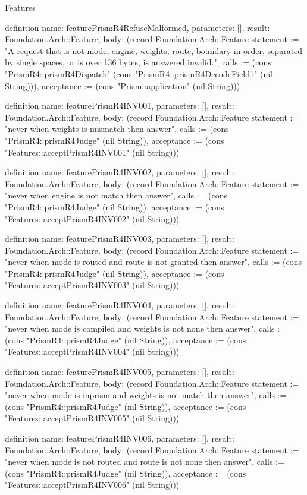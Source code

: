 \begin{lexlean}{Features}
\begin{semanticmodule}
definition{
  name: featurePrismR4RefuseMalformed,
  parameters: [],
  result: Foundation.Arch::Feature,
  body: (record Foundation.Arch::Feature {statement := "A request that is not mode, engine, weights, route, boundary in order, separated by single spaces, or is over 136 bytes, is answered invalid.", calls := (cons "PrismR4::prismR4Dispatch" (cons "PrismR4::prismR4DecodeField1" (nil String))), acceptance := (cons "Prism::application" (nil String))})
}

definition{
  name: featurePrismR4INV001,
  parameters: [],
  result: Foundation.Arch::Feature,
  body: (record Foundation.Arch::Feature {statement := "never when weights is mismatch then answer", calls := (cons "PrismR4::prismR4Judge" (nil String)), acceptance := (cons "Features::acceptPrismR4INV001" (nil String))})
}

definition{
  name: featurePrismR4INV002,
  parameters: [],
  result: Foundation.Arch::Feature,
  body: (record Foundation.Arch::Feature {statement := "never when engine is not match then answer", calls := (cons "PrismR4::prismR4Judge" (nil String)), acceptance := (cons "Features::acceptPrismR4INV002" (nil String))})
}

definition{
  name: featurePrismR4INV003,
  parameters: [],
  result: Foundation.Arch::Feature,
  body: (record Foundation.Arch::Feature {statement := "never when mode is routed and route is not granted then answer", calls := (cons "PrismR4::prismR4Judge" (nil String)), acceptance := (cons "Features::acceptPrismR4INV003" (nil String))})
}

definition{
  name: featurePrismR4INV004,
  parameters: [],
  result: Foundation.Arch::Feature,
  body: (record Foundation.Arch::Feature {statement := "never when mode is compiled and weights is not none then answer", calls := (cons "PrismR4::prismR4Judge" (nil String)), acceptance := (cons "Features::acceptPrismR4INV004" (nil String))})
}

definition{
  name: featurePrismR4INV005,
  parameters: [],
  result: Foundation.Arch::Feature,
  body: (record Foundation.Arch::Feature {statement := "never when mode is inprism and weights is not match then answer", calls := (cons "PrismR4::prismR4Judge" (nil String)), acceptance := (cons "Features::acceptPrismR4INV005" (nil String))})
}

definition{
  name: featurePrismR4INV006,
  parameters: [],
  result: Foundation.Arch::Feature,
  body: (record Foundation.Arch::Feature {statement := "never when mode is not routed and route is not none then answer", calls := (cons "PrismR4::prismR4Judge" (nil String)), acceptance := (cons "Features::acceptPrismR4INV006" (nil String))})
}


\end{semanticmodule}
\end{lexlean}
